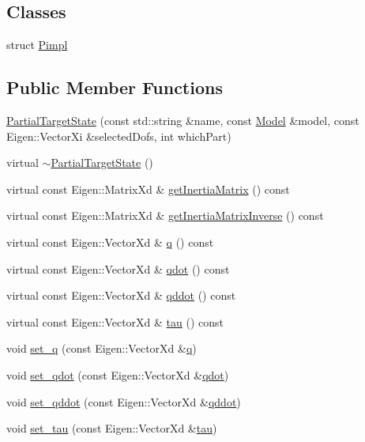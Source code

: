 \subsection*{Classes}
\begin{DoxyCompactItemize}
\item 
struct \hyperlink{structocra_1_1PartialTargetState_1_1Pimpl}{Pimpl}
\end{DoxyCompactItemize}
\subsection*{Public Member Functions}
\begin{DoxyCompactItemize}
\item 
\hyperlink{classocra_1_1PartialTargetState_a2aed8d7e02fa12907eb218449afc6422}{Partial\+Target\+State} (const std\+::string \&name, const \hyperlink{classocra_1_1Model}{Model} \&model, const Eigen\+::\+Vector\+Xi \&selected\+Dofs, int which\+Part)
\item 
virtual \hyperlink{classocra_1_1PartialTargetState_a32d63501a917b40728387258cb1e06d1}{$\sim$\+Partial\+Target\+State} ()
\item 
virtual const Eigen\+::\+Matrix\+Xd \& \hyperlink{classocra_1_1PartialTargetState_acf3f25f1515cbb25d02ec9ee3464df46}{get\+Inertia\+Matrix} () const 
\item 
virtual const Eigen\+::\+Matrix\+Xd \& \hyperlink{classocra_1_1PartialTargetState_a871505d776bcfa0410c7a6043eb85451}{get\+Inertia\+Matrix\+Inverse} () const 
\item 
virtual const Eigen\+::\+Vector\+Xd \& \hyperlink{classocra_1_1PartialTargetState_aec449cfddc55a7d762eb4a9efddc6e63}{q} () const 
\item 
virtual const Eigen\+::\+Vector\+Xd \& \hyperlink{classocra_1_1PartialTargetState_a64c0401f5e250fab6082aaddc84a0ca4}{qdot} () const 
\item 
virtual const Eigen\+::\+Vector\+Xd \& \hyperlink{classocra_1_1PartialTargetState_a603a7c2154d89982d638ee709eae5687}{qddot} () const 
\item 
virtual const Eigen\+::\+Vector\+Xd \& \hyperlink{classocra_1_1PartialTargetState_ad308f9041e4c2438c1a5ac66776bfaaa}{tau} () const 
\item 
void \hyperlink{classocra_1_1PartialTargetState_aa1cf1348c8e9880897df5f7f925dcac5}{set\+\_\+q} (const Eigen\+::\+Vector\+Xd \&\hyperlink{classocra_1_1PartialTargetState_aec449cfddc55a7d762eb4a9efddc6e63}{q})
\item 
void \hyperlink{classocra_1_1PartialTargetState_af04d90592c43ee69ed14e212e7fa2f47}{set\+\_\+qdot} (const Eigen\+::\+Vector\+Xd \&\hyperlink{classocra_1_1PartialTargetState_a64c0401f5e250fab6082aaddc84a0ca4}{qdot})
\item 
void \hyperlink{classocra_1_1PartialTargetState_a4acfcf9b591e296d56c91e00bdbd2a69}{set\+\_\+qddot} (const Eigen\+::\+Vector\+Xd \&\hyperlink{classocra_1_1PartialTargetState_a603a7c2154d89982d638ee709eae5687}{qddot})
\item 
void \hyperlink{classocra_1_1PartialTargetState_a3c58ea195fb95e9a5a5e7a00939f955d}{set\+\_\+tau} (const Eigen\+::\+Vector\+Xd \&\hyperlink{classocra_1_1PartialTargetState_ad308f9041e4c2438c1a5ac66776bfaaa}{tau})
\end{DoxyCompactItemize}

